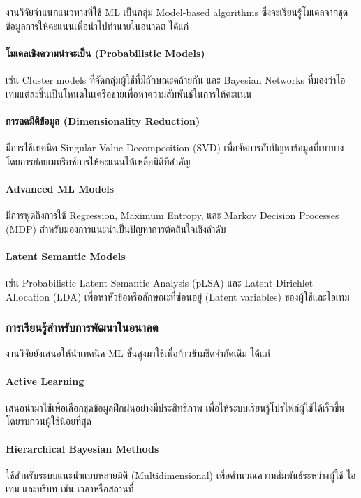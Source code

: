 งานวิจัยจำแนกแนวทางที่ใช้ ML เป็นกลุ่ม Model-based algorithms ซึ่งจะเรียนรู้โมเดลจากชุดข้อมูลการให้คะแนนเพื่อนำไปทำนายในอนาคต ได้แก่ \cite{nextgen_nd}

\paragraph{โมเดลเชิงความน่าจะเป็น (Probabilistic Models)}
เช่น Cluster models ที่จัดกลุ่มผู้ใช้ที่มีลักษณะคล้ายกัน และ Bayesian Networks ที่มองว่าไอเทมแต่ละชิ้นเป็นโหนดในเครือข่ายเพื่อหาความสัมพันธ์ในการให้คะแนน 

\paragraph{การลดมิติข้อมูล (Dimensionality Reduction)}
มีการใช้เทคนิค Singular Value Decomposition (SVD) เพื่อจัดการกับปัญหาข้อมูลที่เบาบาง โดยการย่อยเมทริกซ์การให้คะแนนให้เหลือมิติที่สำคัญ 

\paragraph{Advanced ML Models}
มีการพูดถึงการใช้ Regression, Maximum Entropy, และ Markov Decision Processes (MDP) สำหรับมองการแนะนำเป็นปัญหาการตัดสินใจเชิงลำดับ 

\paragraph{Latent Semantic Models}
เช่น Probabilistic Latent Semantic Analysis (pLSA) และ Latent Dirichlet Allocation (LDA) เพื่อหาหัวข้อหรือลักษณะที่ซ่อนอยู่ (Latent variables) ของผู้ใช้และไอเทม 


\subsubsection{การเรียนรู้สำหรับการพัฒนาในอนาคต}

งานวิจัยยังเสนอให้นำเทคนิค ML ขั้นสูงมาใช้เพื่อก้าวข้ามขีดจำกัดเดิม ได้แก่ \cite{nextgen_nd}

\paragraph{Active Learning}
เสนอนำมาใช้เพื่อเลือกชุดข้อมูลฝึกฝนอย่างมีประสิทธิภาพ เพื่อให้ระบบเรียนรู้โปรไฟล์ผู้ใช้ได้เร็วขึ้นโดยรบกวนผู้ใช้น้อยที่สุด 

\paragraph{Hierarchical Bayesian Methods}
ใช้สำหรับระบบแนะนำแบบหลายมิติ (Multidimensional) เพื่อคำนวณความสัมพันธ์ระหว่างผู้ใช้ ไอเทม และบริบท เช่น เวลาหรือสถานที่ 

